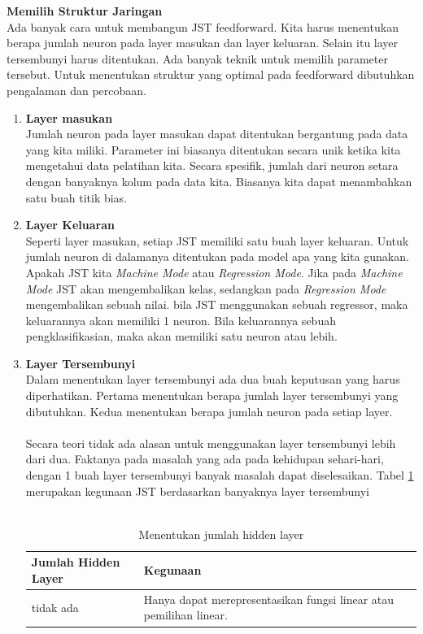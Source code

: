 \textbf{Memilih Struktur Jaringan}\\
Ada banyak cara untuk membangun JST feedforward. Kita harus menentukan berapa jumlah neuron pada layer masukan dan layer keluaran. Selain itu layer tersembunyi harus ditentukan. Ada banyak teknik untuk memilih parameter tersebut. Untuk menentukan struktur yang optimal pada feedforward dibutuhkan pengalaman dan percobaan.
\begin{enumerate}
\item\textbf{Layer masukan}\\Jumlah neuron pada layer masukan dapat ditentukan bergantung pada data yang kita miliki. Parameter ini biasanya ditentukan secara unik ketika kita mengetahui data pelatihan kita. Secara spesifik, jumlah dari neuron setara dengan banyaknya kolum pada data kita. Biasanya kita dapat menambahkan satu buah titik bias.
\item\textbf{Layer Keluaran}\\Seperti layer masukan, setiap JST memiliki satu buah layer keluaran. Untuk jumlah neuron di dalamanya ditentukan pada model apa yang kita gunakan. Apakah JST kita \textit{Machine Mode} atau \textit{Regression Mode}. Jika pada \textit{Machine Mode} JST akan mengembalikan kelas, sedangkan pada \textit{Regression Mode} mengembalikan sebuah nilai. bila JST menggunakan sebuah regressor, maka keluarannya akan memiliki 1 neuron. Bila keluarannya sebuah pengklasifikasian, maka akan memiliki satu neuron atau lebih.
\item\textbf{Layer Tersembunyi}\\Dalam menentukan layer tersembunyi ada dua buah keputusan yang harus diperhatikan. Pertama menentukan berapa jumlah layer tersembunyi yang dibutuhkan. Kedua menentukan berapa jumlah neuron pada setiap layer.\\\\ 
Secara teori tidak ada alasan untuk menggunakan layer tersembunyi lebih dari dua. Faktanya pada masalah yang ada pada kehidupan sehari-hari, dengan 1 buah layer tersembunyi banyak masalah dapat diselesaikan. Tabel \ref{table:jmlhHiddenLayer} merupakan kegunaan JST berdasarkan banyaknya layer tersembunyi\\\\
\begin{table}
\centering
\caption{Menentukan jumlah hidden layer}
\label{table:jmlhHiddenLayer}
\begin{tabular}{|l|p{12cm}|}
\hline
Jumlah Hidden Layer & Kegunaan \\\hline
tidak ada & Hanya dapat merepresentasikan fungsi linear atau pemilihan linear.\\\hline

\end{tabular}
\end{table}
\end{enumerate}
